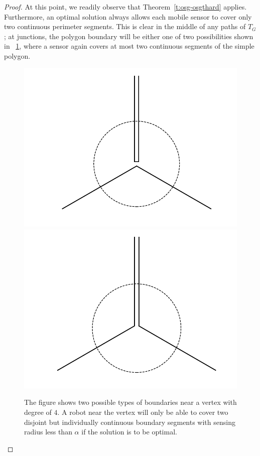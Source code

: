 \begin{proof}
At this point, we readily observe that Theorem~\ref{t:osg-osgthard} applies. 
Furthermore, an optimal solution always allows each mobile sensor to 
cover only two continuous perimeter segments. This is clear in the middle 
of any paths of $T_G$; at junctions, the polygon boundary will be either 
one of two possibilities shown in ~\ref{fig:osg-2types}, where a sensor
again covers at most two continuous segments of the simple polygon. 
\begin{figure}[!ht]
    \centering
    \includegraphics[scale=.29]{chapters/osg/figures/t1-eps-converted-to.pdf}
    \includegraphics[scale=.29]{chapters/osg/figures/t2-eps-converted-to.pdf}
    \caption{The figure shows two possible types of boundaries near a 
		vertex with degree of $4$. A robot near the vertex will only be able 
		to cover two disjoint but individually continuous boundary segments 
		with sensing radius less than $\alpha$ if the solution is to be optimal.}
    \label{fig:osg-2types}
\end{figure}
\end{proof}
